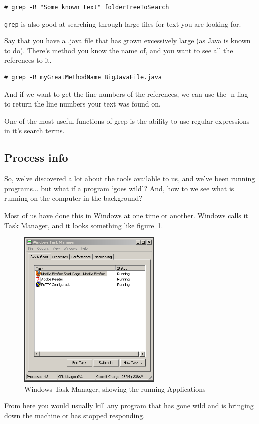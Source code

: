 {\tt \begin{verbatim}
# grep -R "Some known text" folderTreeToSearch
\end{verbatim}
}


{\tt grep} is also good at searching through large files for text you 
are looking for.

Say that you have a .java file that has grown excessively large (as Java is known
to do).
There's method you know the name of, and you want to see all the references to it.

{\tt \begin{verbatim}
# grep -R myGreatMethodName BigJavaFile.java 
\end{verbatim}
}

And if we want to get the line numbers of the references, we can use the -n flag to return
the line numbers your text was found on.

One of the most useful functions of grep is the ability to use regular
expressions in it's search terms.





\subsection {Process info}

So, we've discovered a lot about the tools available to us, and 
we've been running programs... but what if a program `goes wild'? And, 
how to we see what is running on the computer in the background?

Most of us have done this in Windows at one time or another. Windows
calls it Task Manager, and it looks something like figure~\ref{fig:Explorer-Applications}.
\begin{figure}[htbp]
	\centering
		\includegraphics[height=3in]{shell/Explorer-Applications.png}
	\caption{Windows Task Manager, showing the running Applications}
	\label{fig:Explorer-Applications}
\end{figure}
From here you would usually kill any program that has gone wild
and is bringing down the machine or has stopped responding.

